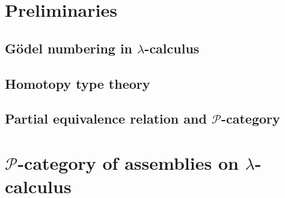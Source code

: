 \documentclass[a4paper,UKenglish,numberwithinsect,cleveref,thm-restate]{lipics-v2021}
\newcommand{\PP}{\mathscr{P}}
\theoremstyle{plain}
\begin{document}
\section{Preliminaries}\label{sec:preliminaries}

\subsection{Gödel numbering in \texorpdfstring{$\lambda$}{λ}-calculus}
\subsection{Homotopy type theory}
\subsection{Partial equivalence relation and $\PP$-category}

\section{\texorpdfstring{$\PP$}{P}-category of assemblies on \texorpdfstring{$\lambda$}{λ}-calculus}\label{sec:assemblies}
\end{document}
